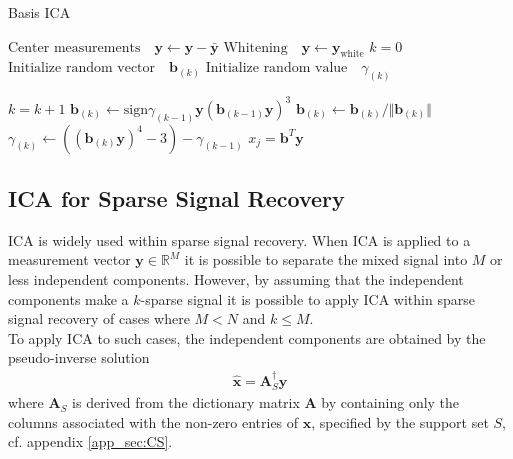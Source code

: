 \begin{algorithm}[H]
\caption{Basis ICA}
\begin{algorithmic}[1]
			\State $\text{Center measurements} \quad \textbf{y} \gets \textbf{y} - \bar{\textbf{y}}$
			\State $\text{Whitening} \quad \textbf{y}\gets \textbf{y}_{\text{white}}$ 
			\EndProcedure  
			\State
			\State$k=0$            
            \State$\text{Initialize random vector} \quad \textbf{b}_{(k)}$ 
            \State$\text{Initialize random value} \quad \gamma_{(k)}$
            
               		\State $k = k+1$
                	\State $\textbf{b}_{(k)} \gets \text{sign}\gamma_{(k-1)} \textbf{y}(\textbf{b}_{(k-1)} \textbf{y})^3$
                	\State $\textbf{b}_{(k)} \gets \textbf{b}_{(k)}/\Vert \textbf{b}_{(k)} \Vert $ 
                	\State $\gamma_{(k)} \gets ((\textbf{b}_{(k)} \textbf{y})^4 - 3) - \gamma_{(k-1)} $
          		\EndWhile
          		\State $x_{j} = \textbf{b}^T\textbf{y}$
          	\EndFor
          	
            \EndProcedure
        \end{algorithmic} 
        \label{alg:basicICA}
\end{algorithm}

\subsection{ICA for Sparse Signal Recovery}
ICA is widely used within sparse signal recovery.   
When ICA is applied to a measurement vector $\mathbf{y} \in \mathbb{R}^{M}$ it is possible to separate the mixed signal into $M$ or less independent components. 
However, by assuming that the  independent components make a $k$-sparse signal it is possible to apply ICA within sparse signal recovery of cases where $M < N$ and $k \leq M$. 
\\
To apply ICA to such cases, the independent components are obtained by the pseudo-inverse solution 
\begin{align*}
\hat{\mathbf{x}} = \mathbf{A}_S^{\dagger} \mathbf{y}
\end{align*}
where $\mathbf{A}_S$ is derived from the dictionary matrix $\mathbf{A}$ by containing only the columns associated with the non-zero entries of $\textbf{x}$, specified by the support set $S$, cf. appendix \ref{app_sec:CS}. 